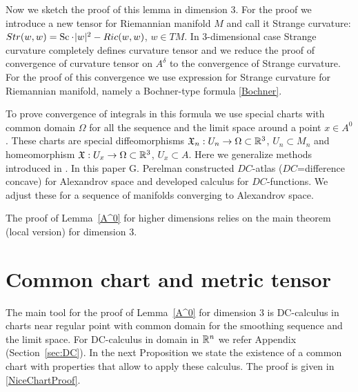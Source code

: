 \documentclass[a4paper,10pt]{article}
\begin{document}
 

  Now we sketch the proof of this lemma in dimension 3. 
 For the proof
 we introduce 
 a new tensor 
 for Riemannian manifold $M$ and call it
 Strange curvature:  $Str(w,w)=\Sc\cdot |w|^2-Ric(w,w)$, $w\in TM$.
 In 3-dimensional case
 Strange curvature
  completely defines curvature tensor
  and we reduce the proof of convergence of curvature tensor
  on $A^\delta$ to the convergence of Strange curvature.
 For the proof of this convergence we use 
 expression for Strange curvature for Riemannian 
 manifold,
namely
 a Bochner-type formula \ref{Bochner}.

To prove convergence of
integrals in this
 formula  we use
special charts with common domain $\Omega$ for all the sequence and the limit space
 around a  point $x\in A^0$.
These charts are special
diffeomorphisms
$\mathfrak X_n:U_n\to\Omega\subset\mathbb{R}^3$, $U_n\subset M_n$ and
homeomorphism
$\mathfrak X:U_x\to\Omega\subset\mathbb{R}^3$, $U_x\subset A$.
Here we  generalize methods introduced in
\cite{PerDC}.  In  this paper G. Perelman 
constructed $DC$-atlas ($DC$=difference concave)
for Alexandrov space and developed calculus for
$DC$-functions. We adjust these for a sequence
of manifolds converging to Alexandrov space.



 
The proof of Lemma~\ref{A^0} for higher dimensions
relies on the main theorem (local version) for dimension 3.



\section{Common chart and metric tensor}

The main tool for the proof
of Lemma~\ref{A^0} for dimension 3
is DC-calculus in  charts near regular point
with common domain for the smoothing sequence and the
limit space. For DC-calculus in domain in $\mathbb{R}^n$
we refer Appendix (Section~\ref{sec:DC}).
In the next Proposition we 
state the existence of a common chart with 
properties that allow to apply these calculus.
The proof is given in \ref{NiceChartProof}.
\end{document}
